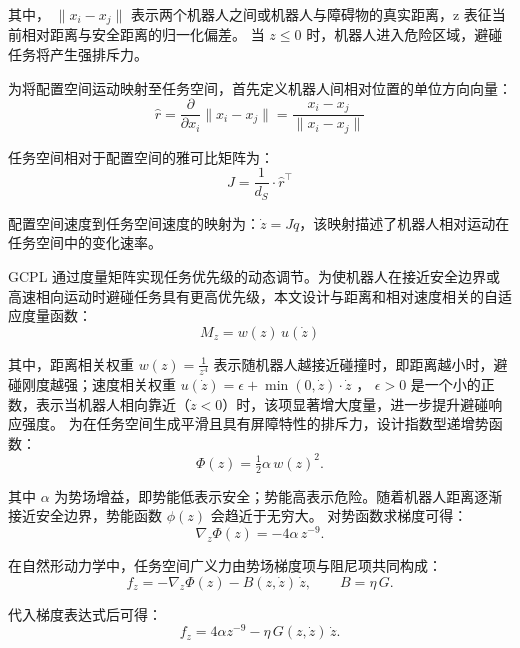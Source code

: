 其中， $\|x_i - x_j\|$ 表示两个机器人之间或机器人与障碍物的真实距离，z 表征当前相对距离与安全距离的归一化偏差。
当 $z\leq 0$ 时，机器人进入危险区域，避碰任务将产生强排斥力。

为将配置空间运动映射至任务空间，首先定义机器人间相对位置的单位方向向量：
\begin{equation}
    \hat r = \frac{\partial}{\partial x_i}\|x_i - x_j\| = \frac{x_i - x_j}{\|x_i - x_j\|}
\end{equation}

任务空间相对于配置空间的雅可比矩阵为：
\begin{equation}
    J = \frac{1}{d_S} \cdot \hat r^\top
\end{equation}

配置空间速度到任务空间速度的映射为：$\dot{z} =J \dot{q}$，该映射描述了机器人相对运动在任务空间中的变化速率。

GCPL 通过度量矩阵实现任务优先级的动态调节。为使机器人在接近安全边界或高速相向运动时避碰任务具有更高优先级，本文设计与距离和相对速度相关的自适应度量函数：
\begin{equation}
    M_z = w(z)\,u(\dot z)
\end{equation}

其中，距离相关权重 $w(z)=\frac{1}{z^4}$ 表示随机器人越接近碰撞时，即距离越小时，避碰刚度越强；速度相关权重 $u(\dot z)=\epsilon + \min(0,\dot z)\cdot \dot z$ ， $\epsilon > 0$ 是一个小的正数，表示当机器人相向靠近（$\dot{z} < 0$）时，该项显著增大度量，进一步提升避碰响应强度。
为在任务空间生成平滑且具有屏障特性的排斥力，设计指数型递增势函数：
\begin{equation}
    \Phi(z) = \tfrac12\alpha\, w(z)^2.
\end{equation}

其中 $\alpha$ 为势场增益，即势能低表示安全；势能高表示危险。随着机器人距离逐渐接近安全边界，势能函数 $\phi(z)$ 会趋近于无穷大。
对势函数求梯度可得：
\begin{equation}
    \nabla_z\Phi(z) = -4\alpha\, z^{-9}.
\end{equation}
 
在自然形动力学中，任务空间广义力由势场梯度项与阻尼项共同构成：
\begin{equation}
    f_z = -\nabla_z\Phi(z) - B(z,\dot z)\,\dot z, \qquad B=\eta\,G.
\end{equation}
 
代入梯度表达式后可得：
\begin{equation}
    f_z = 4\alpha z^{-9} - \eta\,G(z,\dot z)\,\dot z.
\end{equation}
 
